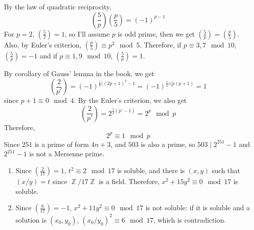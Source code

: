 \documentclass[12pt]{article}
\newenvironment{problem}[2][Problem]{\begin{trivlist}
\item[\hskip \labelsep {\bfseries #1}\hskip \labelsep {\bfseries #2.}]}{\end{trivlist}}
\DeclareMathOperator{\zz}{\mathbb{Z}}
\begin{document}
\begin{problem}{4}
\end{problem}
By the law of quadratic reciprocity,
\begin{equation*}
    \left(\frac{5}{p}\right)\left(\frac{p}{5}\right)=(-1)^{p-1}
\end{equation*}
For $p=2$, $\left(\frac{5}{2}\right)=1$, so I'll assume $p$ is odd prime, then we get $\left(\frac{5}{p}\right)=\left(\frac{p}{5}\right)$. Also, by Euler's criterion, $\left(\frac{p}{5}\right)\equiv p^2\mod 5$. Therefore, if $p\equiv 3,7\mod 10$, $\left(\frac{5}{p}\right)=-1$ and if $p\equiv 1,9\mod 10$, $\left(\frac{5}{p}\right)=1$.
\begin{problem}{5}
By corollary of Gauss' lemma in the book, we get
\begin{equation*}
    \left(\frac{2}{p'}\right)=(-1)^{\frac{1}{8}((2p+1)^2-1}=(-1)^{\frac{1}{2}((p(p+1)}=1
\end{equation*}
since $p+1\equiv 0\mod 4$. By the Euler's criterion, we also get
\begin{equation*}
    \left(\frac{2}{p'}\right)=2^{\frac{1}{2}(p'-1)}=2^p\mod p
\end{equation*}
Therefore,
\begin{equation*}
    2^p\equiv 1\mod p
\end{equation*}
Since $251$ is a prime of form $4n+3$, and $503$ is also a prime, so $503\mid2^{251}-1$ and $2^{251}-1$ is not a Mersenne prime.
\end{problem}
\begin{problem}{6}
\end{problem}
\begin{enumerate}
    \item[(a)] Since $\left(\frac{2}{17}\right)=1$, $t^2\equiv 2\mod 17$ is soluble, and there is $(x,y)$ such that $(x/y)=t$ since $\zz/17\zz$ is a field. Therefore, $x^2+15y^2\equiv 0\mod 17$ is soluble.
    \item[(b)] Since $\left(\frac{6}{17}\right)=-1$, $x^2+11y^2\equiv 0\mod 17$ is not soluble: if it is soluble and a solution is $(x_0,y_0)$, $(x_0/y_0)^2\equiv 6 \mod 17$, which is contradiction.
\end{enumerate}
\end{document}
